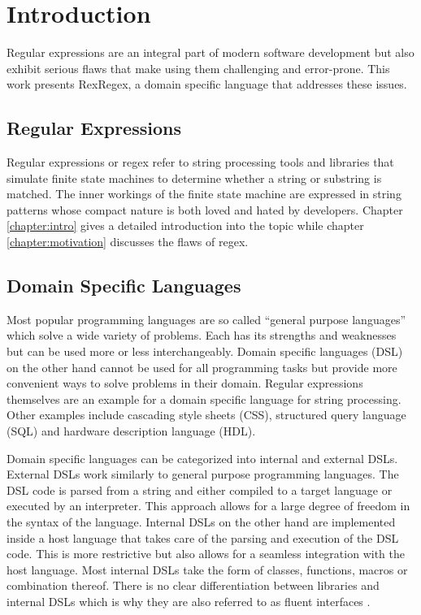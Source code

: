 \chapter{Introduction}

Regular expressions are an integral part of modern software development but also exhibit serious flaws that make using them challenging and error-prone. This work presents RexRegex, a domain specific language that addresses these issues.

\section{Regular Expressions}

Regular expressions or regex refer to string processing tools and libraries that simulate finite state machines to determine whether a string or substring is matched. The inner workings of the finite state machine are expressed in string patterns whose compact nature is both loved and hated by developers. Chapter \ref{chapter:intro} gives a detailed introduction into the topic while chapter \ref{chapter:motivation} discusses the flaws of regex.

\section{Domain Specific Languages}

Most popular programming languages are so called \enquote{general purpose languages} which solve a wide variety of problems. Each has its strengths and weaknesses but can be used more or less interchangeably. Domain specific languages (DSL) on the other hand cannot be used for all programming tasks but provide more convenient ways to solve problems in their domain. Regular expressions themselves are an example for a domain specific language for string processing. Other examples include cascading style sheets (CSS), structured query language (SQL) and hardware description language (HDL).

Domain specific languages can be categorized into internal and external DSLs. External DSLs work similarly to general purpose programming languages. The DSL code is parsed from a string and either compiled to a target language or executed by an interpreter. This approach allows for a large degree of freedom in the syntax of the language. Internal DSLs on the other hand are implemented inside a host language that takes care of the parsing and execution of the DSL code. This is more restrictive but also allows for a seamless integration with the host language. Most internal DSLs take the form of classes, functions, macros or combination thereof. There is no clear differentiation between libraries and internal DSLs which is why they are also referred to as fluent interfaces \cite{FluentInterfacesFowler}.

